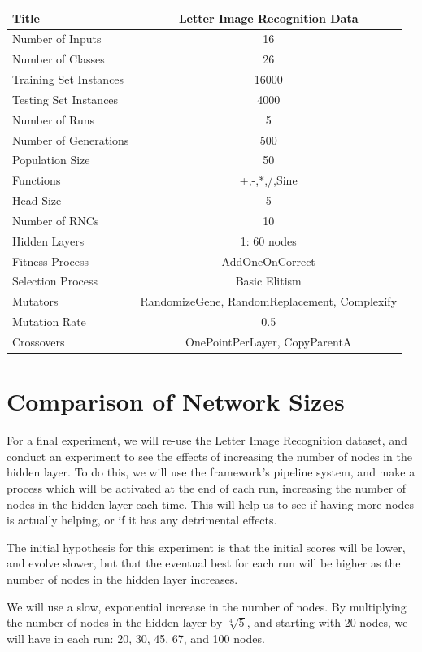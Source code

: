 \documentclass[a4paper,11pt]{report}
\begin{document}
\begin{tabular}{| l | c |}
 \hline
 Title & Letter Image Recognition Data \\
 \hline
 Number of Inputs & 16 \\
 Number of Classes & 26 \\
 Training Set Instances & 16000 \\
 Testing Set Instances & 4000 \\
 Number of Runs & 5 \\
 Number of Generations & 500 \\
 Population Size & 50 \\
 Functions & +,-,*,/,Sine \\
 Head Size & 5 \\
 Number of RNCs & 10 \\
 Hidden Layers & 1: 60 nodes \\
 Fitness Process & AddOneOnCorrect \\
 Selection Process & Basic Elitism \\
 Mutators & RandomizeGene, RandomReplacement, Complexify \\
 Mutation Rate & 0.5 \\
 Crossovers & OnePointPerLayer, CopyParentA \\ 
 \hline
\end{tabular}

\section{Comparison of Network Sizes}
For a final experiment, we will re-use the Letter Image Recognition dataset, and conduct an experiment to see
the effects of increasing the number of nodes in the hidden layer. To do this, we will use 
the framework's pipeline system, and make a process which will be activated at the end of each 
run, increasing the number of nodes in the hidden layer each time. This will help us to see if having 
more nodes is actually helping, or if it has any detrimental effects. 

The initial hypothesis for this experiment is that the initial scores will be lower, and evolve slower, but that 
the eventual best for each run will be higher as the number of nodes in the hidden layer increases. 

We will use a slow, exponential increase in the number of nodes. By multiplying the number of nodes in the hidden 
layer by $\sqrt[4]{5}$, and starting with 20 nodes, we will have in each run: 20, 30, 45, 67, and 100 nodes. 
\end{document}
